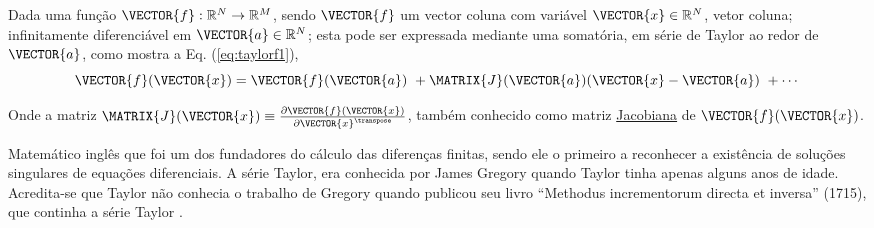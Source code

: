 \begin{proposition}\label{prop:taylorf}
Dada uma função  $\VECTOR{f}:\mathbb{R}^{N}\rightarrow \mathbb{R}^{M}$, 
sendo $\VECTOR{f}$ um vector coluna com variável $\VECTOR{x} \in \mathbb{R}^{N}$, vetor coluna;
infinitamente diferenciável em $\VECTOR{a} \in \mathbb{R}^{N}$;
esta pode ser expressada mediante uma somatória, em série de Taylor 
\cite[pp. 393]{levine1999control} \cite{Taylor} ao redor de $\VECTOR{a}$, como
mostra a Eq. (\ref{eq:taylorf1}),
\begin{equation}\label{eq:taylorf1}
\VECTOR{f}(\VECTOR{x}) =\VECTOR{f}(\VECTOR{a})
      ~+ \MATRIX{J}(\VECTOR{a}) (\VECTOR{x}-\VECTOR{a})
      ~+\cdots 
\end{equation}

Onde a matriz $\MATRIX{J}(\VECTOR{x})\equiv \frac{\partial \VECTOR{f}(\VECTOR{x})}{\partial \VECTOR{x}^{\transpose} }$,
também conhecido como matriz \hyperref[def:jacobian]{Jacobiana} de $\VECTOR{f}(\VECTOR{x})$.
\end{proposition}


\begin{elaboracion}[title=Brook Taylor (1685-1731), width= 0.99\linewidth]
Matemático inglês que foi um dos fundadores do cálculo das diferenças finitas,
sendo ele o primeiro a reconhecer a existência de soluções singulares de equações diferenciais.
A série Taylor, era conhecida por James Gregory quando Taylor tinha apenas alguns anos de idade. 
Acredita-se que Taylor não conhecia o trabalho de Gregory quando publicou seu livro ``Methodus incrementorum directa et inversa'' (1715),
que continha a série Taylor \cite[pp. 198]{agarwal2014creators}.
\end{elaboracion}

